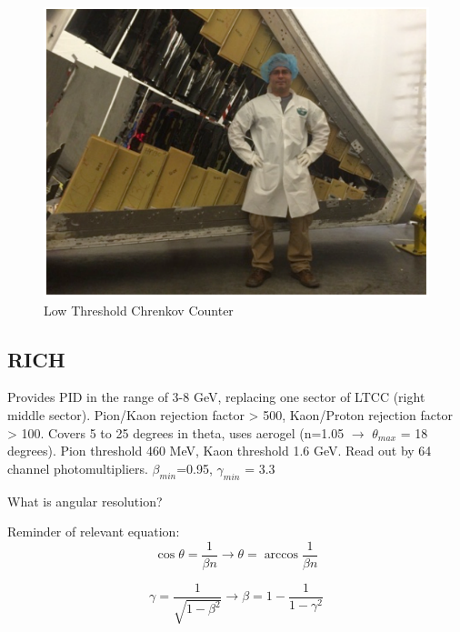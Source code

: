             
						
									
			 \begin{figure}[H]
    			\centering
    			\includegraphics[width=12cm]{CLAS-12/modules/clas-12-system/pics/fd/ltcc.PNG}
    			\caption{Low Threshold Chrenkov Counter}
			\end{figure}
			
			

			
        \subsection{RICH}
            Provides PID in the range of 3-8 GeV, replacing one sector of LTCC (right middle sector). Pion/Kaon rejection factor > 500, Kaon/Proton rejection factor > 100. Covers 5 to 25 degrees in theta, uses aerogel (n=1.05 $\longrightarrow$ $\theta_{max}$ = 18 degrees). Pion threshold 460 MeV, Kaon threshold 1.6 GeV. Read out by 64 channel photomultipliers. $\beta_{min}$=0.95, $\gamma_{min}$ = 3.3
            
            What is angular resolution?
            
            Reminder of relevant equation:
            \begin{equation}
                \cos{\theta} = \frac{1}{\beta n} \longrightarrow \theta = \arccos{\frac{1}{\beta n}}
            \end{equation}
            
            \begin{equation}
                \gamma = \frac{1}{\sqrt{1-\beta^2}} \longrightarrow \beta = 1-\frac{1}{1-\gamma^2} 
            \end{equation}
            

